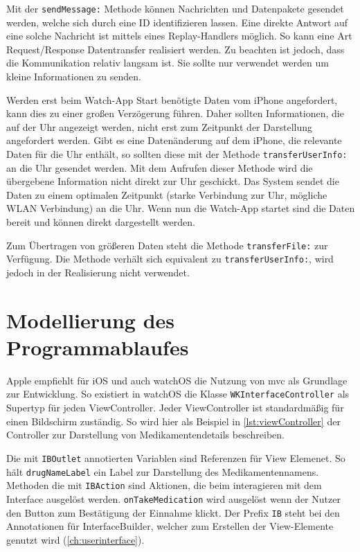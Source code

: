 
 

Mit der \lstinline{sendMessage:} Methode können Nachrichten und Datenpakete gesendet werden, welche sich durch eine ID identifizieren lassen. Eine direkte Antwort auf eine solche Nachricht ist mittels eines Replay-Handlers möglich. So kann eine Art Request/Response Datentransfer realisiert werden. Zu beachten ist jedoch, dass die Kommunikation relativ langsam ist. Sie sollte nur verwendet werden um kleine Informationen zu senden.

Werden erst beim Watch-App Start benötigte Daten vom iPhone angefordert, kann dies zu einer großen Verzögerung führen. Daher sollten Informationen, die auf der Uhr angezeigt werden, nicht erst zum Zeitpunkt der Darstellung angefordert werden. Gibt es eine Datenänderung auf dem iPhone, die relevante Daten für die Uhr enthält, so sollten diese mit der Methode \lstinline{transferUserInfo:}  an die Uhr gesendet werden. Mit dem Aufrufen dieser Methode wird die übergebene Information nicht direkt zur Uhr geschickt. Das System sendet die Daten zu einem optimalen Zeitpunkt (starke Verbindung zur Uhr, mögliche WLAN Verbindung) an die Uhr. Wenn nun die Watch-App startet sind die Daten bereit und können direkt dargestellt werden.

Zum Übertragen von größeren Daten steht die Methode \lstinline{transferFile:} zur Verfügung. Die Methode verhält sich equivalent zu \lstinline{transferUserInfo:}, wird jedoch in der Realisierung nicht verwendet.

\section{Modellierung des Programmablaufes}
Apple empfiehlt für iOS und auch watchOS die Nutzung von \gls{mvc} als Grundlage zur Entwicklung. So existiert in watchOS die Klasse \lstinline{WKInterfaceController} als Supertyp für jeden ViewController. Jeder ViewController ist standardmäßig für einen Bildschirm zuständig. So wird hier als Beispiel in \ref{lst:viewController}  der Controller zur Darstellung von Medikamentendetails beschreiben.

Die mit \lstinline{IBOutlet} annotierten Variablen sind Referenzen für View Elemenet. So hält \lstinline{drugNameLabel} ein Label zur Darstellung des Medikamentennamens. Methoden die mit \lstinline{IBAction} sind Aktionen, die beim interagieren mit dem Interface ausgelöst werden. \lstinline{onTakeMedication} wird ausgelöst wenn der Nutzer den Button zum Bestätigung der Einnahme klickt. Der Prefix \lstinline{IB} steht bei den Annotationen für InterfaceBuilder, welcher zum Erstellen der View-Elemente genutzt wird (\ref{ch:userinterface}).

